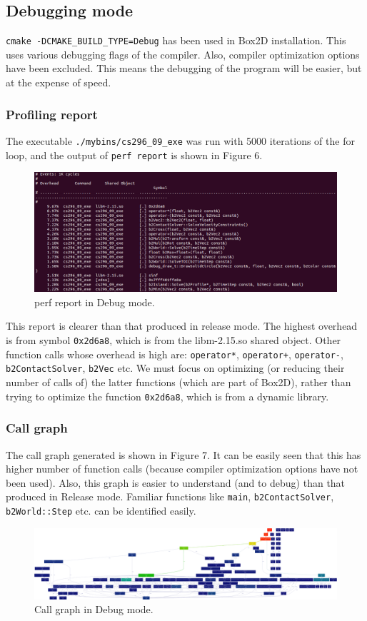 \documentclass[11pt,english]{article}
\begin{document}
\subsection{Debugging mode}
\par{\verb+cmake -DCMAKE_BUILD_TYPE=Debug+ has been used in Box2D installation. This uses various debugging flags of the compiler. Also, compiler optimization options have been excluded. This means the debugging of the program will be easier, but at the expense of speed.}
\subsubsection{Profiling report}
\indent \par{The executable \verb+./mybins/cs296_09_exe+ was run with 5000 iterations of the for loop, and the output of \verb+perf report+ is shown in Figure 6. }
\begin{figure}[h]
\centering
\includegraphics[scale=.33]{debug_report}
\caption{perf report in Debug mode.}
\end{figure}
\indent \par{This report is clearer than that produced in release mode. The highest overhead is from symbol \verb+0x2d6a8+, which is from the libm-2.15.so shared object. Other function calls whose overhead is high are: \verb^operator*^, \verb^operator+^, \verb^operator-^, \verb^b2ContactSolver^, \verb^b2Vec^ etc. We must focus on optimizing (or reducing their number of calls of) the latter functions (which are part of Box2D), rather than trying to optimize the function \verb+0x2d6a8+, which is from a dynamic library.}
\subsubsection{Call graph}
\indent \par{The call graph generated is shown in Figure 7. It can be easily seen that this has higher number of function calls (because compiler optimization options have not been used). Also, this graph is easier to understand (and to debug) than that produced in Release mode. Familiar functions like \verb+main+, \verb+b2ContactSolver+, \verb+b2World::Step+ etc. can be identified easily.}
\begin{figure}[h!]
\centering
\includegraphics[scale=.06]{debug_callgraph}
\caption{Call graph in Debug mode.}
\end{figure}
\end{document}
